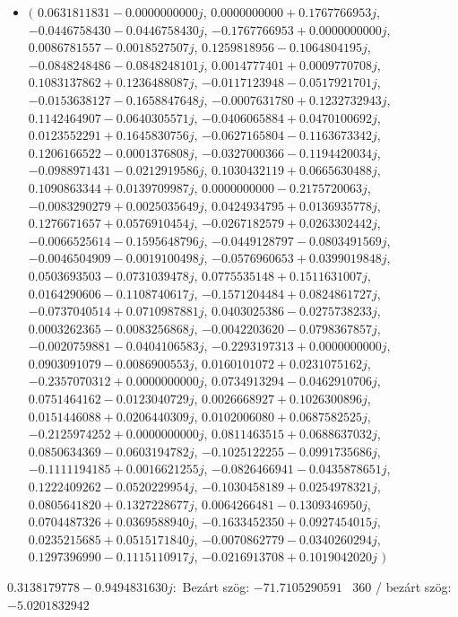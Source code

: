 \documentclass[14pt,a4paper]{article}
\begin{document}
\begin{itemize}
\item
$\big($
$0.0631811831-0.0000000000j$, $0.0000000000+0.1767766953j$, $-0.0446758430-0.0446758430j$, $-0.1767766953+0.0000000000j$, $0.0086781557-0.0018527507j$, $0.1259818956-0.1064804195j$, $-0.0848248486-0.0848248101j$, $0.0014777401+0.0009770708j$, $0.1083137862+0.1236488087j$, $-0.0117123948-0.0517921701j$, $-0.0153638127-0.1658847648j$, $-0.0007631780+0.1232732943j$, $0.1142464907-0.0640305571j$, $-0.0406065884+0.0470100692j$, $0.0123552291+0.1645830756j$, $-0.0627165804-0.1163673342j$, $0.1206166522-0.0001376808j$, $-0.0327000366-0.1194420034j$, $-0.0988971431-0.0212919586j$, $0.1030432119+0.0665630488j$, $0.1090863344+0.0139709987j$, $0.0000000000-0.2175720063j$, $-0.0083290279+0.0025035649j$, $0.0424934795+0.0136935778j$, $0.1276671657+0.0576910454j$, $-0.0267182579+0.0263302442j$, $-0.0066525614-0.1595648796j$, $-0.0449128797-0.0803491569j$, $-0.0046504909-0.0019100498j$, $-0.0576960653+0.0399019848j$, $0.0503693503-0.0731039478j$, $0.0775535148+0.1511631007j$, $0.0164290606-0.1108740617j$, $-0.1571204484+0.0824861727j$, $-0.0737040514+0.0710987881j$, $0.0403025386-0.0275738233j$, $0.0003262365-0.0083256868j$, $-0.0042203620-0.0798367857j$, $-0.0020759881-0.0404106583j$, $-0.2293197313+0.0000000000j$, $0.0903091079-0.0086900553j$, $0.0160101072+0.0231075162j$, $-0.2357070312+0.0000000000j$, $0.0734913294-0.0462910706j$, $0.0751464162-0.0123040729j$, $0.0026668927+0.1026300896j$, $0.0151446088+0.0206440309j$, $0.0102006080+0.0687582525j$, $-0.2125974252+0.0000000000j$, $0.0811463515+0.0688637032j$, $0.0850634369-0.0603194782j$, $-0.1025122255-0.0991735686j$, $-0.1111194185+0.0016621255j$, $-0.0826466941-0.0435878651j$, $0.1222409262-0.0520229954j$, $-0.1030458189+0.0254978321j$, $0.0805641820+0.1327228677j$, $0.0064266481-0.1309346950j$, $0.0704487326+0.0369588940j$, $-0.1633452350+0.0927454015j$, $0.0235215685+0.0515171840j$, $-0.0070862779-0.0340260294j$, $0.1297396990-0.1115110917j$, $-0.0216913708+0.1019042020j$
$\big)$
\end{itemize}
$0.3138179778-0.9494831630j$:\
Bezárt szög: $-71.7105290591$ \
360 / bezárt szög: $-5.0201832942$\
\end{document}

